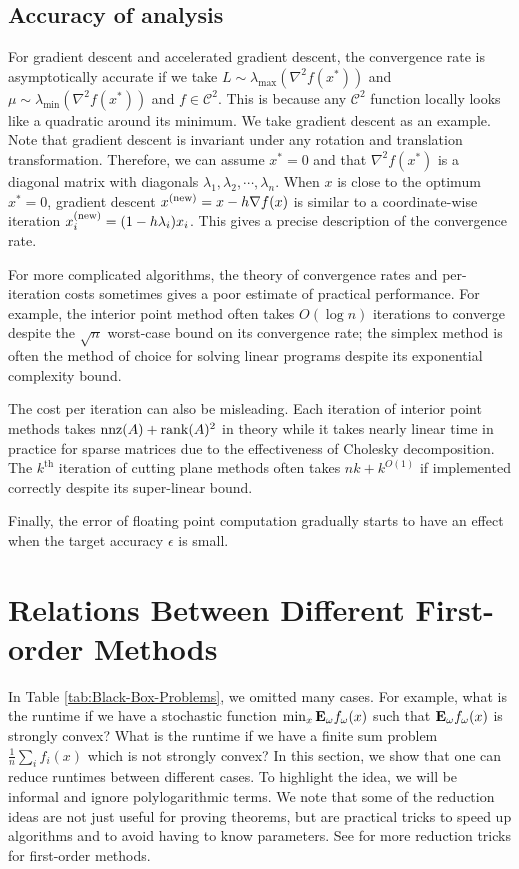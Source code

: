 \subsection{Accuracy of analysis}

For gradient descent and accelerated gradient descent, the convergence
rate is asymptotically accurate if we take $L\sim\lambda_{\max}(\nabla^{2}f(x^{*}))$
and $\mu\sim\lambda_{\min}(\nabla^{2}f(x^{*}))$ and $f\in\mathcal{C}^{2}$.
This is because any $\mathcal{C}^{2}$ function locally looks like
a quadratic around its minimum. We take gradient descent as an example.
Note that gradient descent is invariant under any rotation and translation
transformation. Therefore, we can assume $x^{*}=0$ and that $\nabla^{2}f(x^{*})$
is a diagonal matrix with diagonals $\lambda_{1},\lambda_{2},\cdots,\lambda_{n}$.
When $x$ is close to the optimum $x^{*}=0$, gradient descent $x^{(\mathrm{new})}=x-h\nabla f(x)$
is similar to a coordinate-wise iteration $x^{(\mathrm{new})}_{i}=(1-h\lambda_{i})x_{i}$.
This gives a precise description of the convergence rate.

For more complicated algorithms, the theory of convergence rates and
per-iteration costs sometimes gives a poor estimate of practical performance.
For example, the interior point method often takes $O(\log n)$ iterations
to converge despite the $\sqrt{n}$ worst-case bound on its convergence
rate; the simplex method is often the method of choice for solving
linear programs despite its exponential complexity bound.

The cost per iteration can also be misleading. Each iteration of interior
point methods takes $\mathrm{nnz}(A)+\mathrm{rank}(A)^{2}$ in theory while
it takes nearly linear time in practice for sparse matrices due to
the effectiveness of Cholesky decomposition. The $k^{\mathrm{th}}$
iteration of cutting plane methods often takes $nk+k^{O(1)}$ if implemented
correctly despite its super-linear bound.

Finally, the error of floating point computation gradually starts
to have an effect when the target accuracy $\epsilon$ is small.

\section{Relations Between Different First-order Methods}

In Table \ref{tab:Black-Box-Problems}, we omitted many cases. For
example, what is the runtime if we have a stochastic function $\min_{x}\mathbf{E}_{\omega}f_{\omega}(x)$
such that $\mathbf{E}_{\omega}f_{\omega}(x)$ is strongly convex? What is
the runtime if we have a finite sum problem $\frac{1}{n}\sum_{i}f_{i}(x)$
which is not strongly convex? In this section, we show that one can
reduce runtimes between different cases. To highlight the idea, we
will be informal and ignore polylogarithmic terms. We note that some
of the reduction ideas are not just useful for proving theorems, but
are practical tricks to speed up algorithms and to avoid having to
know parameters. See \cite{lin2015universal,frostig2015regularizing,o2015adaptive,allen2016optimal}
for more reduction tricks for first-order methods.

